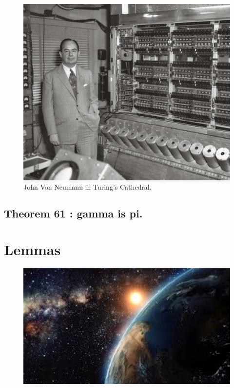 \documentclass[preview]{standalone}
\begin{document}
% 
\begin{figure}[!h]
    \centering
    \includegraphics[width=11.5cm]{../resources/jpg/2.2.set.operations/neumann.jpg}
    \caption*{John Von Neumann in Turing's Cathedral.}
\end{figure}
\vspace{-1\baselineskip}
\subsection[Gamma is pi.]
    {
        \color{section}Theorem 61 \color{black} : gamma is pi.
    }

\pagebreak


\section{Lemmas}
\begin{figure}[!h]
    \centering
    \includegraphics[width=14cm]{../resources/jpg/2.2.set.operations/sun.jpg}
\end{figure}
\end{document}

